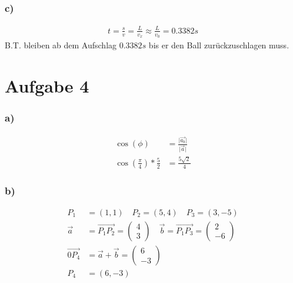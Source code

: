 \documentclass[a4paper,11pt]{article}
\begin{document}
      \subsubsection*{c)}
        \begin{align*}
          t=\frac{s}{v}=\frac{L}{v_x}\approx\frac{L}{v_0}=0.3382s
        \end{align*}
        B.T. bleiben ab dem Aufschlag $0.3382s$ bis er den Ball zurückzuschlagen muss.
\section*{Aufgabe 4}
  \subsubsection*{a)}
    \begin{align*}
      \cos(\phi)&=\frac{\vert\vec{a_b}\vert}{\vert\vec{a}\vert} \\
      \cos(\frac{\pi}{4})*\frac{5}{2}&=\frac{5\sqrt{2}}{4}
    \end{align*}
  \subsubsection*{b)}
    \begin{align*}
      P_1&=(1,1) \quad P_2=(5,4) \quad P_3=(3,-5) \\
      \vec{a}&=\vec{P_1P_2}=\begin{pmatrix}4\\3\end{pmatrix} \quad \vec{b}=\vec{P_1P_3}=\begin{pmatrix}2\\-6\end{pmatrix} \\
      \vec{0P_4}&=\vec{a}+\vec{b}=\begin{pmatrix}6\\-3\end{pmatrix} \\
      P_4&=(6,-3)
    \end{align*}
\end{document}
